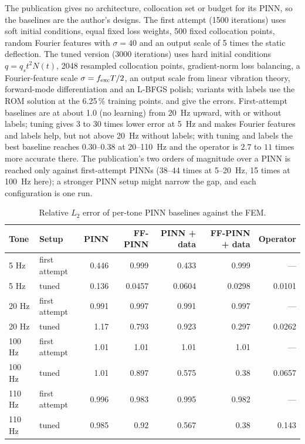 The publication gives no architecture, collocation set or budget for its PINN, so the baselines are the author's designs. The first attempt (1500 iterations) uses soft initial conditions, equal fixed loss weights, 500 fixed collocation points, random Fourier features with $\sigma=40$ and an output scale of 5 times the static deflection. The tuned version (3000 iterations) uses hard initial conditions $q=q_st^2N(t)$, 2048 resampled collocation points, gradient-norm loss balancing, a Fourier-feature scale $\sigma=f_{\rm exc}T/2$, an output scale from linear vibration theory, forward-mode differentiation and an L-BFGS polish; variants with labels use the ROM solution at the 6.25\,\% training points.  and  give the errors. First-attempt baselines are at about 1.0 (no learning) from 20~Hz upward, with or without labels; tuning gives 3 to 30 times lower error at 5~Hz and makes Fourier features and labels help, but not above 20~Hz without labels; with tuning and labels the best baseline reaches $0.30$--$0.38$ at 20--110~Hz and the operator is $2.7$ to $11$ times more accurate there. The publication's two orders of magnitude over a PINN is reached only against first-attempt PINNs ($38$--$44$ times at 5--20~Hz, 15 times at 100~Hz here); a stronger PINN setup might narrow the gap, and each configuration is one run.

\begin{table}[tbp]
\centering\footnotesize
\caption{Relative $L_2$ error of per-tone PINN baselines against the FEM.}\label{tab:vf-fr-pinn}
\begin{tabular}{@{}llrrrrr@{}}
\toprule
Tone & Setup & PINN & FF-PINN & PINN + data & FF-PINN + data & Operator\\
\midrule
5 Hz & first attempt & 0.446 & 0.999 & 0.433 & 0.999 & ---\\
5 Hz & tuned & 0.136 & 0.0457 & 0.0604 & 0.0298 & 0.0101\\
20 Hz & first attempt & 0.991 & 0.997 & 0.991 & 0.997 & ---\\
20 Hz & tuned & 1.17 & 0.793 & 0.923 & 0.297 & 0.0262\\
100 Hz & first attempt & 1.01 & 1.01 & 1.01 & 1.01 & ---\\
100 Hz & tuned & 1.01 & 0.897 & 0.575 & 0.38 & 0.0657\\
110 Hz & first attempt & 0.996 & 0.983 & 0.995 & 0.982 & ---\\
110 Hz & tuned & 0.985 & 0.92 & 0.567 & 0.38 & 0.143\\
\bottomrule
\end{tabular}
\end{table}

